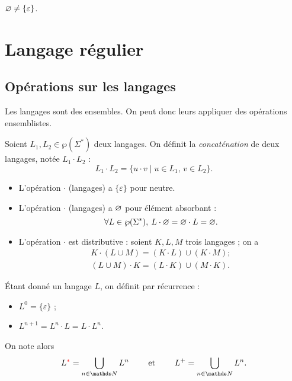 \begin{rmk}[\danger\!\!]
	$\varnothing \neq \{\varepsilon\}$.
\end{rmk}

\section{Langage régulier}

\subsection{Opérations sur les langages}

\begin{rmk}
	Les langages sont des ensembles. On peut donc leurs appliquer des opérations ensemblistes.
\end{rmk}

\begin{defn}
	Soient $L_1, L_2 \in \wp(\Sigma^*)$ deux langages. On définit la {\it concaténation}\/ de deux langages, notée $L_1 \cdot L_2$\/ : \[
		L_1 \cdot L_2 = \{u \cdot v  \mid u \in L_1,\,v \in L_2\}
	.\]
\end{defn}

\begin{rmk}
	\begin{itemize}
		\item L'opération $\cdot$\/ (langages) a $\{\varepsilon\}$\/ pour neutre.
		\item L'opération $\cdot$\/ (langages) a $\varnothing$\/ pour élément absorbant : \[
					\forall L \in \wp(\Sigma^*),\:L\cdot \varnothing = \varnothing\cdot L = \varnothing
			.\]
		\item L'opération $\cdot $\/ est distributive : soient $K, L, M$\/ trois langages ; on a 
			\begin{gather*}
				K \cdot (L \cup M) = (K \cdot  L) \cup (K \cdot M) ;\\
				(L \cup M) \cdot K = (L\cdot K) \cup (M\cdot K).
			\end{gather*}
	\end{itemize}
\end{rmk}

\begin{defn}
	Étant donné un langage $L$, on définit par récurrence : 
	\begin{itemize}
		\item $L^0 = \{\varepsilon\}$\/ ;
		\item $L^{n+1} = L^n \cdot L = L \cdot L^n$.\protect\footnotemark
	\end{itemize}
	On note alors \[
		L^{\red *} = \bigcup_{n \in \N} L^n \qquad \text{ et } \qquad L^+ = \bigcup_{n \in \N} L^n
	.\]
\end{defn}

